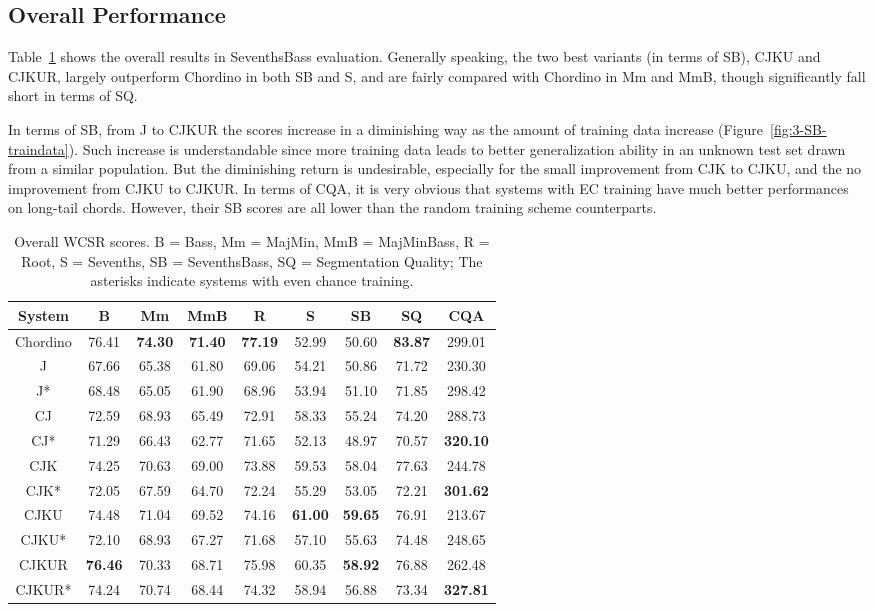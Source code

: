\subsection{Overall Performance}
Table~\ref{tab:4-overallres} shows the overall results in SeventhsBass evaluation. Generally speaking, the two best variants (in terms of SB), CJKU and CJKUR, largely outperform Chordino in both SB and S, and are fairly compared with Chordino in Mm and MmB, though significantly fall short in terms of SQ.

In terms of SB, from J to CJKUR the scores increase in a diminishing way as the amount of training data increase (Figure~\ref{fig:3-SB-traindata}). Such increase is understandable since more training data leads to better generalization ability in an unknown test set drawn from a similar population. But the diminishing return is undesirable, especially for the small improvement from CJK to CJKU, and the no improvement from CJKU to CJKUR. In terms of CQA, it is very obvious that systems with EC training have much better performances on long-tail chords. However, their SB scores are all lower than the random training scheme counterparts.
\begin{table}[htb]
\caption{Overall WCSR scores. B = Bass, Mm = MajMin, MmB = MajMinBass, R = Root, S = Sevenths, SB = SeventhsBass, SQ = Segmentation Quality; The asterisks indicate systems with even chance training.}
\label{tab:4-overallres}
\centering
\scriptsize
\begin{tabular}{|c|c|c|c|c|c|c|c|c|}\hline
System & B & Mm & MmB & R & S & SB & SQ & CQA \\ \hline
Chordino & 76.41 & \textbf{74.30} & \textbf{71.40} & \textbf{77.19} & 52.99 & 50.60 & \textbf{83.87} & 299.01\\ \hline
J& 67.66 & 65.38 & 61.80 & 69.06 & 54.21 & 50.86 & 71.72 & 230.30 \\ \hline
J* & 68.48 & 65.05 & 61.90 & 68.96 & 53.94 & 51.10 & 71.85 & 298.42 \\ \hline
CJ & 72.59 & 68.93 & 65.49 & 72.91 & 58.33 & 55.24 & 74.20 & 288.73 \\ \hline
CJ* & 71.29 & 66.43 & 62.77 & 71.65 & 52.13 & 48.97 & 70.57 & \textbf{320.10} \\ \hline
CJK & 74.25 & 70.63 & 69.00 & 73.88 & 59.53 & 58.04 & 77.63 & 244.78 \\ \hline
CJK* & 72.05 & 67.59 & 64.70 & 72.24 & 55.29 & 53.05 & 72.21& \textbf{301.62} \\ \hline
CJKU & 74.48 & 71.04 & 69.52 & 74.16 & \textbf{61.00} & \textbf{59.65} & 76.91 & 213.67 \\ \hline
CJKU* & 72.10 & 68.93 & 67.27 & 71.68 & 57.10 & 55.63 & 74.48 & 248.65 \\ \hline
CJKUR & \textbf{76.46} & 70.33 & 68.71 & 75.98 & 60.35 & \textbf{58.92} & 76.88 & 262.48 \\ \hline
CJKUR* & 74.24 & 70.74 & 68.44 & 74.32 & 58.94 & 56.88 & 73.34 & \textbf{327.81} \\ \hline
\end{tabular}
\end{table}

